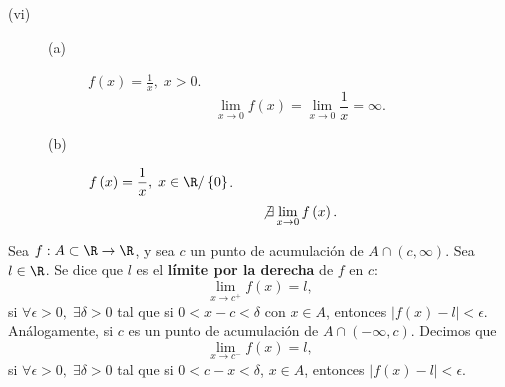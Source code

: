 \begin{eg}
\begin{description}
\item[(vi)] 
	\begin{description}
	\item[(a)] $\displaystyle f\left(x\right) = \frac{1}{x}, \; x > 0 $.
		\[\lim_{x \to 0}f\left(x\right) = \lim_{x \to 0}\frac{1}{x}=\infty .\]
	\item[(b)] $\displaystyle f\left(x\right)=\frac{1}{x}, \; x \in \R/ \left\{ 0\right\}  $.
		\[\not\exists\lim_{x \to 0}f\left(x\right) .\]
	\end{description}
\end{description}
\end{eg}

\begin{fdefinition}
	\normalfont Sea $\displaystyle f: A \subset \R \to \R $, y sea $\displaystyle c $ un punto de acumulación de $\displaystyle A \cap \left(c, \infty\right) $. Sea $\displaystyle l \in \R $. Se dice que $\displaystyle l $ es el \textbf{límite por la derecha} de $\displaystyle f $ en $\displaystyle c $: \[\displaystyle \lim_{x \to c^{+}}f\left(x\right) = l, \] si $\displaystyle \forall \epsilon >0, \; \exists \delta > 0 $ tal que si $\displaystyle 0 < x - c < \delta  $ con $\displaystyle x \in A $, entonces $\displaystyle \left|f\left(x\right)-l\right|<\epsilon  $. \\
Análogamente, si $\displaystyle c $ es un punto de acumulación de $\displaystyle A \cap \left(-\infty, c\right) $. Decimos que 
\[\lim_{x \to c^{-}}f\left(x\right) = l ,\]
si $\displaystyle \forall \epsilon > 0, \; \exists \delta > 0 $ tal que si $\displaystyle 0 < c - x < \delta$, $\displaystyle x \in A $, entonces $\displaystyle \left|f\left(x\right)-l\right|<\epsilon $. 
\end{fdefinition}

